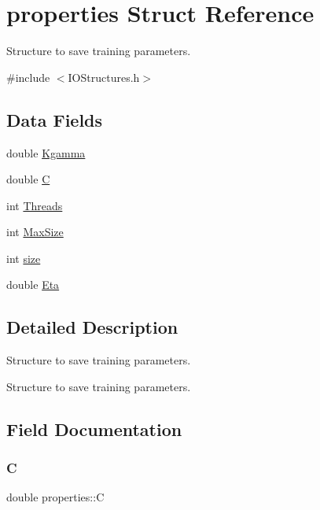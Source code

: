 \hypertarget{structproperties}{}\section{properties Struct Reference}
\label{structproperties}


Structure to save training parameters.  




{\ttfamily \#include $<$I\+O\+Structures.\+h$>$}

\subsection*{Data Fields}
\begin{DoxyCompactItemize}
\item 
double \hyperlink{structproperties_aab9c0195a446f08fc782701750ddb6ac}{Kgamma}
\item 
double \hyperlink{structproperties_a3b98814395b295db30f029e5e67ae9c9}{C}
\item 
int \hyperlink{structproperties_a56ab77c44fb808e71990074bd75529ed}{Threads}
\item 
int \hyperlink{structproperties_a42219768dd35e1ab628e1785759df400}{Max\+Size}
\item 
int \hyperlink{structproperties_a1694aebbbdd904f9b0e5faca725966b6}{size}
\item 
double \hyperlink{structproperties_abd91deb543a31a6a1f75892af7cf95c8}{Eta}
\end{DoxyCompactItemize}


\subsection{Detailed Description}
Structure to save training parameters. 

Structure to save training parameters. 

\subsection{Field Documentation}
\hypertarget{structproperties_a3b98814395b295db30f029e5e67ae9c9}{}\label{structproperties_a3b98814395b295db30f029e5e67ae9c9} 
\subsubsection{\texorpdfstring{C}{C}}
{\ttfamily double properties\+::C}


